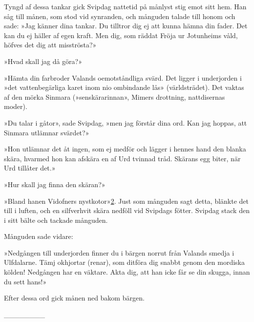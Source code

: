 Tyngd af dessa tankar gick Svipdag nattetid på månlyst stig emot sitt
hem. Han såg till månen, som stod vid synranden, och månguden talade
till honom och sade: »Jag känner dina tankar. Du tilltror dig ej att
kunna hämna din fader. Det kan du ej häller af egen kraft. Men dig, som
räddat Fröja ur Jotunheims våld, höfves det dig att misströsta?»

»Hvad skall jag då göra?»

»Hämta din farbroder Valands oemotståndliga svärd. Det ligger i
underjorden i »det vattenbegärliga karet inom nio ombindande lås»
(världsträdet). Det vaktas af den mörka Sinmara (»senskärarinnan»,
Mimers drottning, nattdisernas moder).

»Du talar i gåtor», sade Svipdag, »men jag förstår dina ord. Kan jag
hoppas, att Sinmara utlämnar svärdet?»

»Hon utlämnar det åt ingen, som ej medför och lägger i hennes hand den
blanka skära, hvarmed hon kan afskära
\protect\hypertarget{lb1625905.xhtmlux5cux23start119}{}{}\protect\hypertarget{lb1625905.xhtmlux5cux23start119-a}{}{}\protect\hypertarget{lb1625905.xhtmlux5cux23start119-b}{}{}\protect\hypertarget{lb1625905.xhtmlux5cux23start119-c}{}{}\protect\hypertarget{lb1625905.xhtmlux5cux23start119-d}{}{}
en af Urd tvinnad tråd. Skärans egg biter, när Urd tillåter det.»

»Hur skall jag finna den skäran?»

»Bland hanen Vidofners
nystkotor»{\protect\hyperlink{lb1625905.xhtmlux5cux23n2}{2}}. Just som
månguden sagt detta, blänkte det till i luften, och en silfverhvit skära
nedföll vid Svipdags fötter. Svipdag stack den i sitt bälte och tackade
månguden.

Månguden sade vidare:

»Nedgången till underjorden finner du i bärgen norrut från Valands
smedja i Ulfdalarne. Tämj okhjortar (renar), som ditföra dig snabbt
genom den mordiska kölden! Nedgången har en väktare. Akta dig, att han
icke får se din skugga, innan du sett hans!»

Efter dessa ord gick månen ned bakom bärgen.

{\_\_\_\_\_\_\_\_}

